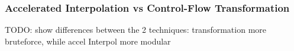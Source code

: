 \begin{frame}[t]
	\frametitle{Accelerated Interpolation vs Control-Flow Transformation}
	TODO: show differences between the 2 techniques: transformation more bruteforce, while accel Interpol more modular 
\end{frame}